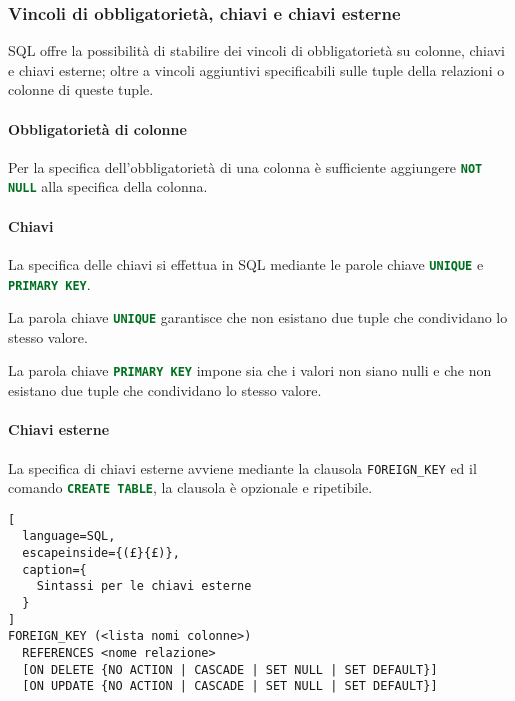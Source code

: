 \subsubsection{Vincoli di obbligatorietà, chiavi e chiavi esterne}%
\label{ssub:Vincoli di obbligatorietà}
SQL offre la possibilità di stabilire dei vincoli di obbligatorietà su colonne,
chiavi e chiavi esterne; oltre a vincoli aggiuntivi specificabili sulle tuple
della relazioni o colonne di queste tuple.

\paragraph{Obbligatorietà di colonne}%
\label{par:Obbligatorietà di colonne}
Per la specifica dell'obbligatorietà di una colonna è sufficiente aggiungere
\lstinline[language=SQL]{NOT NULL} alla specifica della colonna.

\paragraph{Chiavi}%
\label{par:Chiavi}
La specifica delle chiavi si effettua in SQL mediante le parole chiave
\lstinline[language=SQL]{UNIQUE} e \lstinline[language=SQL]{PRIMARY KEY}.

La parola chiave \lstinline[language=SQL]{UNIQUE} garantisce che non esistano
due tuple che condividano lo stesso valore.

La parola chiave \lstinline[language=SQL]{PRIMARY KEY} impone sia che i valori
non siano nulli e che non esistano due tuple che condividano lo stesso valore.

\paragraph{Chiavi esterne}%
\label{par:Chiavi esterne}
La specifica di chiavi esterne avviene mediante la clausola
\lstinline[language=SQL]{FOREIGN_KEY} ed il comando
\lstinline[language=SQL]{CREATE TABLE}, la clausola è opzionale e ripetibile.

\begin{lstlisting}[
  language=SQL,
  escapeinside={(£}{£)},
  caption={
    Sintassi per le chiavi esterne
  }
]
FOREIGN_KEY (<lista nomi colonne>)
  REFERENCES <nome relazione>
  [ON DELETE {NO ACTION | CASCADE | SET NULL | SET DEFAULT}]
  [ON UPDATE {NO ACTION | CASCADE | SET NULL | SET DEFAULT}]
\end{lstlisting}

